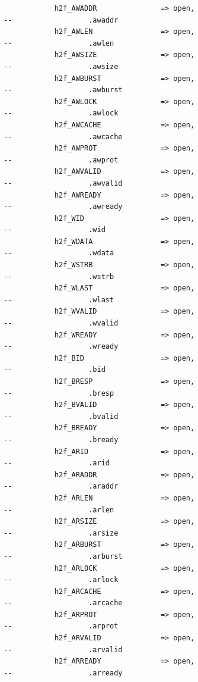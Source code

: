 \documentclass[conference]{IEEEtran}
\begin{document}
\begin{lstlisting}
			h2f_AWADDR               => open,                            --                  .awaddr
			h2f_AWLEN                => open,                            --                  .awlen
			h2f_AWSIZE               => open,                            --                  .awsize
			h2f_AWBURST              => open,                            --                  .awburst
			h2f_AWLOCK               => open,                            --                  .awlock
			h2f_AWCACHE              => open,                            --                  .awcache
			h2f_AWPROT               => open,                            --                  .awprot
			h2f_AWVALID              => open,                            --                  .awvalid
			h2f_AWREADY              => open,                            --                  .awready
			h2f_WID                  => open,                            --                  .wid
			h2f_WDATA                => open,                            --                  .wdata
			h2f_WSTRB                => open,                            --                  .wstrb
			h2f_WLAST                => open,                            --                  .wlast
			h2f_WVALID               => open,                            --                  .wvalid
			h2f_WREADY               => open,                            --                  .wready
			h2f_BID                  => open,                            --                  .bid
			h2f_BRESP                => open,                            --                  .bresp
			h2f_BVALID               => open,                            --                  .bvalid
			h2f_BREADY               => open,                            --                  .bready
			h2f_ARID                 => open,                            --                  .arid
			h2f_ARADDR               => open,                            --                  .araddr
			h2f_ARLEN                => open,                            --                  .arlen
			h2f_ARSIZE               => open,                            --                  .arsize
			h2f_ARBURST              => open,                            --                  .arburst
			h2f_ARLOCK               => open,                            --                  .arlock
			h2f_ARCACHE              => open,                            --                  .arcache
			h2f_ARPROT               => open,                            --                  .arprot
			h2f_ARVALID              => open,                            --                  .arvalid
			h2f_ARREADY              => open,                            --                  .arready

\end{lstlisting}
\end{document}
